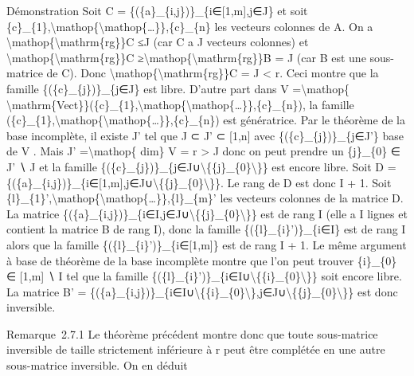 \documentclass[]{article}
\begin{document}
Démonstration Soit C = \{(\{a\}\_\{i,j\})\}\_\{i∈{[}1,m{]},j∈J\} et soit
\{c\}\_\{1\},\textbackslash{}mathop\{\textbackslash{}mathop\{\ldots{}\}\},\{c\}\_\{n\}
les vecteurs colonnes de A. On a
\textbackslash{}mathop\{\textbackslash{}mathrm\{rg\}\}C
≤\textbar{}J\textbar{} (car C a \textbar{}J\textbar{} vecteurs colonnes)
et \textbackslash{}mathop\{\textbackslash{}mathrm\{rg\}\}C
≥\textbackslash{}mathop\{\textbackslash{}mathrm\{rg\}\}B =
\textbar{}J\textbar{} (car B est une sous-matrice de C). Donc
\textbackslash{}mathop\{\textbackslash{}mathrm\{rg\}\}C =
\textbar{}J\textbar{} \textless{} r. Ceci montre que la famille
\{(\{c\}\_\{j\})\}\_\{j∈J\} est libre. D'autre part dans V
=\textbackslash{}mathop\{
\textbackslash{}mathrm\{Vect\}\}(\{c\}\_\{1\},\textbackslash{}mathop\{\textbackslash{}mathop\{\ldots{}\}\},\{c\}\_\{n\}),
la famille
(\{c\}\_\{1\},\textbackslash{}mathop\{\textbackslash{}mathop\{\ldots{}\}\},\{c\}\_\{n\})
est génératrice. Par le théorème de la base incomplète, il existe J' tel
que J ⊂ J' ⊂ {[}1,n{]} avec \{(\{c\}\_\{j\})\}\_\{j∈J'\} base de V .
Mais \textbar{}J'\textbar{} =\textbackslash{}mathop\{ dim\} V = r
\textgreater{} \textbar{}J\textbar{} donc on peut prendre un
\{j\}\_\{0\} ∈ J' ∖ J et la famille
\{(\{c\}\_\{j\})\}\_\{j∈J∪\textbackslash{}\{\{j\}\_\{0\}\textbackslash{}\}\}
est encore libre. Soit D =
\{(\{a\}\_\{i,j\})\}\_\{i∈{[}1,m{]},j∈J∪\textbackslash{}\{\{j\}\_\{0\}\textbackslash{}\}\}.
Le rang de D est donc \textbar{}I\textbar{} + 1. Soit
\{l\}\_\{1\}',\textbackslash{}mathop\{\textbackslash{}mathop\{\ldots{}\}\},\{l\}\_\{m\}'
les vecteurs colonnes de la matrice D. La matrice
\{(\{a\}\_\{i,j\})\}\_\{i∈I,j∈J∪\textbackslash{}\{\{j\}\_\{0\}\textbackslash{}\}\}
est de rang \textbar{}I\textbar{} (elle a \textbar{}I\textbar{} lignes
et contient la matrice B de rang \textbar{}I\textbar{}), donc la famille
\{(\{l\}\_\{i\}')\}\_\{i∈I\} est de rang \textbar{}I\textbar{} alors que
la famille \{(\{l\}\_\{i\}')\}\_\{i∈{[}1,m{]}\} est de rang
\textbar{}I\textbar{} + 1. Le même argument à base de théorème de la
base incomplète montre que l'on peut trouver \{i\}\_\{0\} ∈ {[}1,m{]} ∖
I tel que la famille
\{(\{l\}\_\{i\}')\}\_\{i∈I∪\textbackslash{}\{\{i\}\_\{0\}\textbackslash{}\}\}
soit encore libre. La matrice B' =
\{(\{a\}\_\{i,j\})\}\_\{i∈I∪\textbackslash{}\{\{i\}\_\{0\}\textbackslash{}\},j∈J∪\textbackslash{}\{\{j\}\_\{0\}\textbackslash{}\}\}
est donc inversible.

Remarque~2.7.1 Le théorème précédent montre donc que toute sous-matrice
inversible de taille strictement inférieure à r peut être complétée en
une autre sous-matrice inversible. On en déduit
\end{document}
